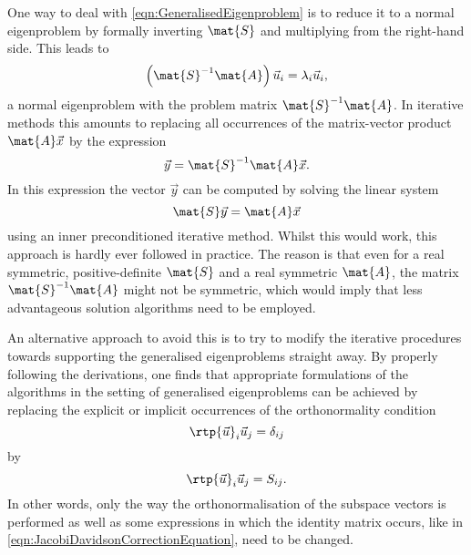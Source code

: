 One way to deal with \eqref{eqn:GeneralisedEigenproblem} is to reduce
it to a normal eigenproblem by formally inverting $\mat{S}$
and multiplying from the right-hand side.
This leads to
\[
	\left( \mat{S}^{-1} \mat{A} \right) \vec{u}_i = \lambda_i \vec{u}_i,
\]
a normal eigenproblem with the problem matrix $\mat{S}^{-1} \mat{A}$.
In iterative methods this amounts to replacing all occurrences
of the matrix-vector product $\mat{A}\vec{x}$ by the expression
\[ \vec{y} = \mat{S}^{-1} \mat{A} \vec{x}. \]
In this expression the vector $\vec{y}$ can be computed by solving the linear system
\[ \mat{S} \vec{y} = \mat{A} \vec{x} \]
using an inner preconditioned iterative method.
Whilst this would work,
this approach is hardly ever followed in practice.
The reason is that even for a real symmetric, positive-definite $\mat{S}$
and a real symmetric $\mat{A}$,
the matrix $\mat{S}^{-1} \mat{A}$ might not be symmetric,
which would imply that less advantageous solution algorithms need to be employed.

% 
%

An alternative approach to avoid this
is to try to modify the iterative procedures towards supporting the generalised
eigenproblems straight away.
By properly following the derivations, one finds that
appropriate formulations of the algorithms in the setting of generalised
eigenproblems can be achieved by replacing the explicit or implicit
occurrences of the orthonormality condition
\[ \rtp{\vec{u}}_i \vec{u}_j = \delta_{ij} \]
by
\[  \rtp{\vec{u}}_i \vec{u}_j = S_{ij}. \]
In other words, only the way the orthonormalisation of the subspace vectors
is performed as well as some expressions in which the identity matrix
occurs,
like in \eqref{eqn:JacobiDavidsonCorrectionEquation},
need to be changed.

